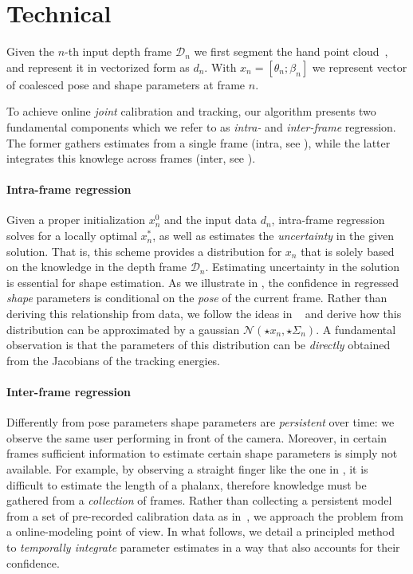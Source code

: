 \section{Technical}
Given the $n$-th input depth frame $\mathcal{D}_n$ we first segment the hand point cloud~\cite{htrack}, and represent it in vectorized form as $d_n$. With $x_n = [\theta_n; \beta_n]$ we represent vector of coalesced pose and shape parameters at frame $n$. 

To achieve online \emph{joint} calibration and tracking, our algorithm presents two fundamental components which we refer to as \emph{intra-} and \emph{inter-frame} regression. The former gathers estimates from a single frame (intra, see ), while the latter integrates this knowlege across frames (inter, see ). 



\paragraph{Intra-frame regression}
Given a proper initialization $x_n^0$ and the input data $d_n$, intra-frame regression solves for a locally optimal $x_n^*$, as well as estimates the \emph{uncertainty} in the given solution. That is, this scheme provides a distribution for $x_n$ that is solely based on the knowledge in the depth frame $\mathcal{D}_n$.
Estimating uncertainty in the solution is essential for shape estimation. As we illustrate in , the confidence in regressed \emph{shape} parameters is conditional on the \emph{pose} of the current frame.
Rather than deriving this relationship from data, we follow the ideas in ~ and derive how this distribution can be approximated by a gaussian $\mathcal{N}(\star{x}_n, \star{\Sigma}_n)$. A fundamental observation is that the parameters of this distribution can be \emph{directly} obtained from the Jacobians of the tracking energies.


\paragraph{Inter-frame regression}
Differently from pose parameters shape parameters are \emph{persistent} over time: we observe the same user performing in front of the camera. Moreover, in certain frames sufficient information to estimate certain shape parameters is simply not available. For example, by observing a straight finger like the one in , it is difficult to estimate the length of a phalanx, therefore knowledge must be gathered from a \emph{collection} of frames. Rather than collecting a persistent model from a set of pre-recorded calibration data as in~\cite{taylor_sig16}, we approach the problem from a online-modeling point of view. In what follows, we detail a principled method to \emph{temporally integrate} parameter estimates in a way that also accounts for their confidence.

